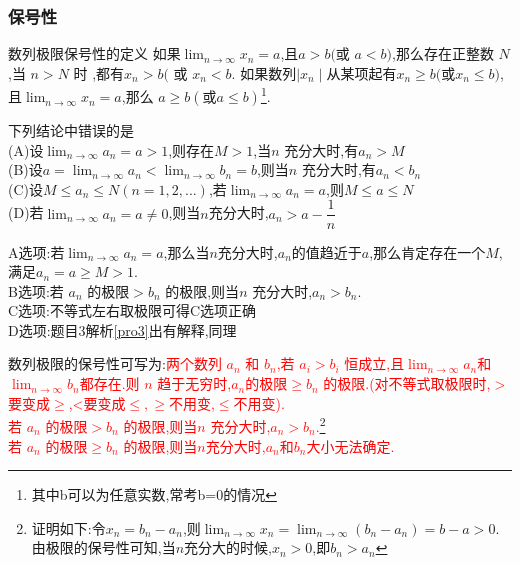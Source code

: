 \documentclass[8pt a4paper, oneside, UTF8]{ctexbook}
\begin{document}
\begin{sloppypar}
    \subsubsection{保号性}
    \begin{defn}{数列极限保号性的定义}{}
        如果$\lim_{n\to\infty}x_n=a$,且$a{>}b( $或 $a{<}b)$,那么存在正整数 $N$,当 $n{>}N$ 时 ,都有$x_n{>}b($ 或 $x_n{<}b$.\newline
        如果数列$\mid x_n\mid$从某项起有$x_n\geqslant b($或$x_n\leqslant b)$,且$\lim_{n\to\infty}x_n=a $,那么 $a\geqslant b( 或 a\leqslant b)$\footnote{其中b可以为任意实数,常考b=0的情况}.
    \end{defn}
    \begin{problem}
        下列结论中错误的是\\
        (A)设$\lim _{n\to\infty}a_n=a>1$,则存在$M>1$,当$n$ 充分大时,有$a_n>M$\\
        (B)设$a=\lim_{n\to\infty}a_n<\lim_{n\to\infty}b_n=b$,则当$n$ 充分大时,有$a_n<b_n$ \\
        (C)设$M\leqslant a_n\leqslant N(n=1,2,...)$,若$\lim_{n\to\infty} a_n=a$,则$M\leqslant a\leqslant N$ \\
        (D)若$\lim_{n\to\infty} a_n=a\neq0$,则当$n$充分大时,$a_n>a-\dfrac1n$ 
    \end{problem}
    \begin{solution}
        A选项:若$\lim_{n \to \infty}a_n=a$,那么当$n$充分大时,$a_n$的值趋近于$a$,那么肯定存在一个$M$,满足$a_n = a \geqslant M > 1.$\\
        B选项:若 $a_n$ 的极限$>b_n$ 的极限,则当$n$ 充分大时,$a_n>b_n$.\\
        C选项:不等式左右取极限可得C选项正确\\
        D选项:题目3解析\ref{pro3}出有解释,同理
    \end{solution}
    \begin{note}
        数列极限的保号性可写为:\textcolor{red}{两个数列 $a_n$ 和 $b_n$,若 $a_i>b_i$ 恒成立,且$\lim_{n \to \infty}a_n$和$\lim_{n\to \infty}b_n$都存在.则 $n$ 趋于无穷时,$a_n$的极限$\geqslant b_n$ 的极限.(对不等式取极限时,$>$要变成$\geqslant$,<要变成$\leqslant,\geqslant$不用变,$\leqslant$不用变).}\\
        \textcolor{red}{若 $a_n$ 的极限$>b_n$ 的极限,则当$n$ 充分大时,$a_n>b_n$.}\footnote{证明如下:令$x_n=b_n-a_n$,则$\lim_{n \to \infty}x_n=\lim_{n\to \infty}(b_n-a_n)=b-a>0$.由极限的保号性可知,当$n$充分大的时候,$x_n>0$,即$b_n>a_n$}\\
        \textcolor{red}{若 $a_n$ 的极限$\geqslant b_n$ 的极限,则当$n$充分大时,$a_n$和$b_n$大小无法确定.}
    \end{note}


\end{sloppypar}
\end{document}
